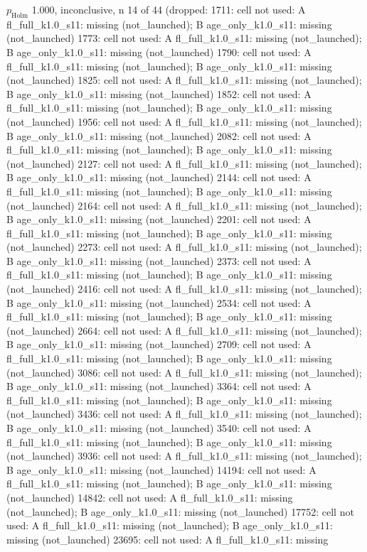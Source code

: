 \begin{table}[t]
{$p_\mathrm{Holm}$ 1.000, inconclusive, n 14 of 44 (dropped: 1711: cell not used: A fl\_full\_k1.0\_s11: missing (not\_launched); B age\_only\_k1.0\_s11: missing (not\_launched) \textbar{} 1773: cell not used: A fl\_full\_k1.0\_s11: missing (not\_launched); B age\_only\_k1.0\_s11: missing (not\_launched) \textbar{} 1790: cell not used: A fl\_full\_k1.0\_s11: missing (not\_launched); B age\_only\_k1.0\_s11: missing (not\_launched) \textbar{} 1825: cell not used: A fl\_full\_k1.0\_s11: missing (not\_launched); B age\_only\_k1.0\_s11: missing (not\_launched) \textbar{} 1852: cell not used: A fl\_full\_k1.0\_s11: missing (not\_launched); B age\_only\_k1.0\_s11: missing (not\_launched) \textbar{} 1956: cell not used: A fl\_full\_k1.0\_s11: missing (not\_launched); B age\_only\_k1.0\_s11: missing (not\_launched) \textbar{} 2082: cell not used: A fl\_full\_k1.0\_s11: missing (not\_launched); B age\_only\_k1.0\_s11: missing (not\_launched) \textbar{} 2127: cell not used: A fl\_full\_k1.0\_s11: missing (not\_launched); B age\_only\_k1.0\_s11: missing (not\_launched) \textbar{} 2144: cell not used: A fl\_full\_k1.0\_s11: missing (not\_launched); B age\_only\_k1.0\_s11: missing (not\_launched) \textbar{} 2164: cell not used: A fl\_full\_k1.0\_s11: missing (not\_launched); B age\_only\_k1.0\_s11: missing (not\_launched) \textbar{} 2201: cell not used: A fl\_full\_k1.0\_s11: missing (not\_launched); B age\_only\_k1.0\_s11: missing (not\_launched) \textbar{} 2273: cell not used: A fl\_full\_k1.0\_s11: missing (not\_launched); B age\_only\_k1.0\_s11: missing (not\_launched) \textbar{} 2373: cell not used: A fl\_full\_k1.0\_s11: missing (not\_launched); B age\_only\_k1.0\_s11: missing (not\_launched) \textbar{} 2416: cell not used: A fl\_full\_k1.0\_s11: missing (not\_launched); B age\_only\_k1.0\_s11: missing (not\_launched) \textbar{} 2534: cell not used: A fl\_full\_k1.0\_s11: missing (not\_launched); B age\_only\_k1.0\_s11: missing (not\_launched) \textbar{} 2664: cell not used: A fl\_full\_k1.0\_s11: missing (not\_launched); B age\_only\_k1.0\_s11: missing (not\_launched) \textbar{} 2709: cell not used: A fl\_full\_k1.0\_s11: missing (not\_launched); B age\_only\_k1.0\_s11: missing (not\_launched) \textbar{} 3086: cell not used: A fl\_full\_k1.0\_s11: missing (not\_launched); B age\_only\_k1.0\_s11: missing (not\_launched) \textbar{} 3364: cell not used: A fl\_full\_k1.0\_s11: missing (not\_launched); B age\_only\_k1.0\_s11: missing (not\_launched) \textbar{} 3436: cell not used: A fl\_full\_k1.0\_s11: missing (not\_launched); B age\_only\_k1.0\_s11: missing (not\_launched) \textbar{} 3540: cell not used: A fl\_full\_k1.0\_s11: missing (not\_launched); B age\_only\_k1.0\_s11: missing (not\_launched) \textbar{} 3936: cell not used: A fl\_full\_k1.0\_s11: missing (not\_launched); B age\_only\_k1.0\_s11: missing (not\_launched) \textbar{} 14194: cell not used: A fl\_full\_k1.0\_s11: missing (not\_launched); B age\_only\_k1.0\_s11: missing (not\_launched) \textbar{} 14842: cell not used: A fl\_full\_k1.0\_s11: missing (not\_launched); B age\_only\_k1.0\_s11: missing (not\_launched) \textbar{} 17752: cell not used: A fl\_full\_k1.0\_s11: missing (not\_launched); B age\_only\_k1.0\_s11: missing (not\_launched) \textbar{} 23695: cell not used: A fl\_full\_k1.0\_s11: missing }
\end{table}
